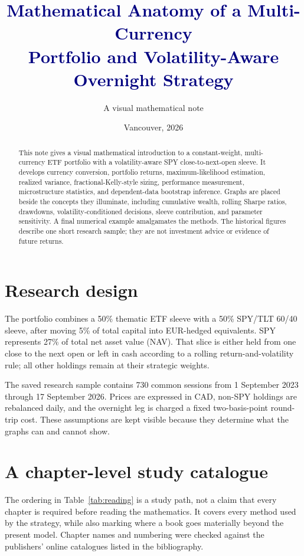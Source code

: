 \documentclass[11pt]{article}
\title{\textcolor{navy}{\textbf{Mathematical Anatomy of a Multi-Currency\\
Portfolio and Volatility-Aware Overnight Strategy}}}
\author{A visual mathematical note}
\date{Vancouver, 2026}
\begin{document}
\maketitle

\begin{abstract}
This note gives a visual mathematical introduction to a constant-weight, multi-currency ETF
portfolio with a volatility-aware SPY close-to-next-open sleeve. It develops currency conversion,
portfolio returns, maximum-likelihood estimation, realized variance, fractional-Kelly-style
sizing, performance measurement, microstructure statistics, and dependent-data bootstrap
inference. Graphs are placed beside the concepts they illuminate, including cumulative wealth,
rolling Sharpe ratios, drawdowns, volatility-conditioned decisions, sleeve contribution, and
parameter sensitivity. A final numerical example amalgamates the methods. The historical figures
describe one short research sample; they are not investment advice or evidence of future returns.
\end{abstract}

\tableofcontents

\section{Research design}\label{sec:scope}

The portfolio combines a 50\% thematic ETF sleeve with a 50\% SPY/TLT 60/40 sleeve, after moving
5\% of total capital into EUR-hedged equivalents. SPY represents 27\% of total net asset value
(NAV). That slice is either held from one close to the next open or left in cash according to a
rolling return-and-volatility rule; all other holdings remain at their strategic weights.

The saved research sample contains 730 common sessions from 1 September 2023 through
17 September 2026. Prices are expressed in CAD, non-SPY holdings are rebalanced daily, and the
overnight leg is charged a fixed two-basis-point round-trip cost. These assumptions are kept
visible because they determine what the graphs can and cannot show.

\section{A chapter-level study catalogue}\label{sec:catalogue}

The ordering in Table~\ref{tab:reading} is a study path, not a claim that every chapter is required
before reading the mathematics. It covers every method used by the strategy, while also marking
where a book goes materially beyond the present model. Chapter names and numbering were
checked against the publishers' online catalogues listed in the bibliography.
\end{document}
